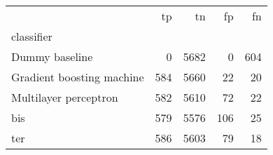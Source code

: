 \begin{tabular}{lrrrr}
\toprule
 & tp & tn & fp & fn \\
classifier &  &  &  &  \\
\midrule
Dummy baseline & 0 & 5682 & 0 & 604 \\
Gradient boosting machine & 584 & 5660 & 22 & 20 \\
Multilayer perceptron & 582 & 5610 & 72 & 22 \\
bis & 579 & 5576 & 106 & 25 \\
ter & 586 & 5603 & 79 & 18 \\
\bottomrule
\end{tabular}
